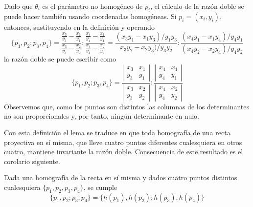 \begin{obs}
	Dado que $\theta_i$ es el parámetro no homogéneo de $p_i$, el cálculo de la razón doble se puede hacer también usando coordenadas homogéneas. Si $p_i=(x_i,y_i)$, entonces, sustituyendo en la definición y operando
	\begin{equation*}
		\{p_1,p_2;p_3,p_4\}=\frac{\frac{x_3}{y_3}-\frac{x_1}{y_1}}{\frac{x_3}{y_3}-\frac{x_2}{y_2}}:\frac{\frac{x_4}{y_4}-\frac{x_1}{y_1}}{\frac{x_4}{y_4}-\frac{x_2}{y_2}}=\frac{(x_3y_1-x_1y_3)/y_1y_3}{x_3y_2-x_2y_3)/y_3y_2}:\frac{(x_4y_1-x_1y_4)/y_4y_1}{(x_4y_2-x_2y_4)/y_4y_2}
	\end{equation*}
	la razón doble se puede escribir como
	\begin{equation}
	\{p_1,p_2;p_3,p_4\}=\frac{
		\left| \begin{array}{cc}
				x_3&x_1\\
				y_3&y_1
		\end{array}\right|}{
		\left| \begin{array}{cc}
		x_3&x_2\\
		y_3&y_2
		\end{array}\right|}:\frac{
		\left| \begin{array}{cc}
		x_4&x_1\\
		y_4&y_1
		\end{array}\right|}{
		\left| \begin{array}{cc}
		x_4&x_2\\
		y_4&y_2
		\end{array}\right|}
	\end{equation}
	Observemos que, como los puntos son distintos las columnas de los determinantes no son proporcionales y, por tanto, ningún determinante en nulo.
\end{obs}
Con esta definición el lema se traduce en que toda homografía de una recta proyectiva en sí misma, que lleve cuatro puntos diferentes cualesquiera en otros cuatro, mantiene invariante la razón doble. Consecuencia de este resultado es el corolario siguiente.
\begin{cor}
	Dada una homografía de la recta en sí misma y dados cuatro puntos distintos cualesquiera $\{p_1,p_2,p_3,p_4\}$, se cumple
	\begin{equation}
	\{p_1,p_2;p_3,p_4\}=\{h(p_1),h(p_2);h(p_3),h(p_4)\}
	\end{equation} 
\end{cor}

